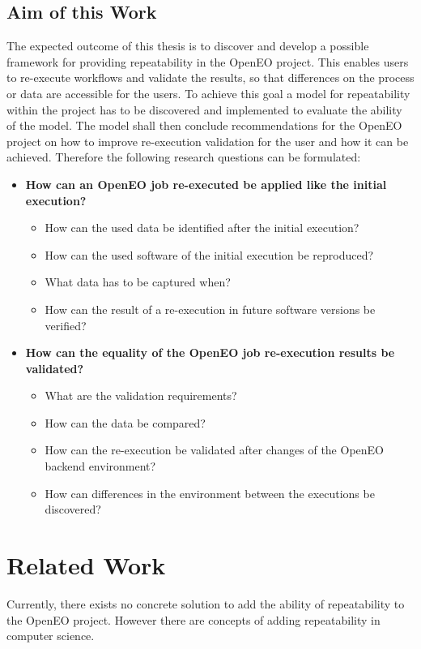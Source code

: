 \documentclass[draft,final]{vutinfth} %
\begin{document}
\section{Aim of this Work}

The expected outcome of this thesis is to discover and develop a possible framework for providing repeatability in the OpenEO project. This enables users to re-execute workflows and validate the results, so that differences on the process or data are accessible for the users. To achieve this goal a model for repeatability within the project has to be discovered and implemented to evaluate the ability of the model. The model shall then conclude recommendations for the OpenEO project on how to improve re-execution validation for the user and how it can be achieved. Therefore the following research questions can be formulated:

\begin{itemize}
	\item \textbf{How can an OpenEO job re-executed be applied like the initial execution?}
	\begin{itemize}
		\item How can the used data be identified after the initial execution?
		\item How can the used software of the initial execution be reproduced?
		\item What data has to be captured when?
		\item How can the result of a re-execution in future software versions be verified?
	\end{itemize}
	\item \textbf{How can the equality of the OpenEO job re-execution results be validated?}
	\begin{itemize}
		\item What are the validation requirements?
		\item How can the data be compared?
		\item How can the re-execution be validated after changes of the OpenEO backend environment?
		\item How can differences in the environment between the executions be discovered?
	\end{itemize}
\end{itemize}
\chapter{Related Work}
Currently, there exists no concrete solution to add the ability of repeatability to the OpenEO project. However there are concepts of adding repeatability in computer science.
\end{document}
